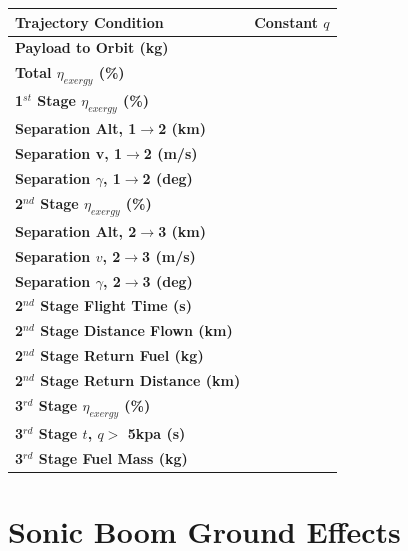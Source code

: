 \begin{table}[H]
	\centering
\begin{tabular}{l c } 
	\hline \textbf{Trajectory Condition}
	& Constant $q$
	\\
	\hline \textbf{Payload to Orbit (kg)}
	& \textbf{\PayloadToOrbitConstqReturn}
	\\
	\textbf{Total $\eta_{exergy}$ (\%)}
	& \textbf{\totalExergyEffConstqReturn}
	\\
	\hline 
	\textbf{1$^{st}$ Stage $\eta_{exergy}$ (\%)}
	& \textbf{\firstExergyEffConstqReturn}
	\\
	\textbf{Separation Alt, 1$\rightarrow$2 (km)}
	& \firstsecondSeparationAltConstqReturn
	\\
	\textbf{Separation v, 1$\rightarrow$2 (m/s)}
	& \firstsecondSeparationvConstqReturn
	\\
	\textbf{Separation $\gamma$, 1$\rightarrow$2 (deg)}
	& \firstsecondSeparationgammaConstqReturn
	\\
	\hline 
	\textbf{2$^{nd}$ Stage $\eta_{exergy}$ (\%)}
	& \textbf{\secondExergyEffConstqReturn}
	\\
	\textbf{Separation Alt, 2$\rightarrow$3 (km)}
	& \secondthirdSeparationAltConstqReturn
	\\
	\textbf{Separation $v$, 2$\rightarrow$3 (m/s)}
	& \secondthirdSeparationvConstqReturn
	\\
	\textbf{Separation $\gamma$, 2$\rightarrow$3 (deg)}
	& \secondthirdSeparationgammaConstqReturn
	\\
	\textbf{2$^{nd}$ Stage Flight Time (s)}
	& \secondFlightTimeConstqReturn
	\\
	\textbf{2$^{nd}$ Stage Distance Flown (km)}
	& \SecondDistConstqReturn
	\\
	\textbf{2$^{nd}$ Stage Return Fuel (kg)}
	& \returnFuelConstqReturn
	\\
	\textbf{2$^{nd}$ Stage Return Distance (km)}
	& \returnDistConstqReturn
	\\
	\hline 
	\textbf{3$^{rd}$ Stage $\eta_{exergy}$ (\%)}
	& \textbf{\thirddExergyEffConstqReturn}
	\\
	\textbf{3$^{rd}$ Stage $t$, $q >$ 5kpa (s)}
	& \thirdqOverFiveConstqReturn
	\\
	\textbf{3$^{rd}$ Stage Fuel Mass (kg)}
	& \thirdmFuelConstqReturn
	\\
	\hline 
\end{tabular} 
\end{table}

\section{Sonic Boom Ground Effects}

